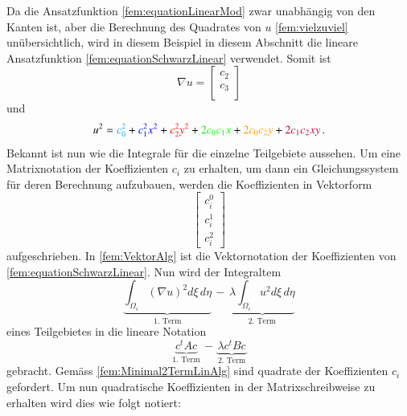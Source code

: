 Da die Ansatzfunktion \eqref{fem:equationLinearMod} zwar unabhängig von den Kanten ist, aber die Berechnung des Quadrates von $u$ \eqref{fem:vielzuviel} unübersichtlich, wird in diesem Beispiel in diesem Abschnitt die lineare Ansatzfunktion \eqref{fem:equationSchwarzLinear} verwendet. Somit ist
\begin{equation}
	\nabla u = 	
	\left[ \begin{array}{r}
	c_2 \\
	c_3 \\
	\end{array}\right] 
	\label{fem:equationSchwarzquadratischPP}
\end{equation}  
und 
\begin{equation}
 	u^2 = \textcolor{cyan}{c_0^2} + \textcolor{blue}{c_1^2 x^2} + \textcolor{red}{c_2^2 y^2} + \textcolor{green}{2 c_0 c_1 x} + \textcolor{orange}{2 c_0 c_2 y} +\textcolor{purple}{ 2 c_1 c_2 xy} \, .
	\label{fem:equationSchwarzquadratischQQQ}
\end{equation}  
Bekannt ist nun wie die Integrale für die einzelne Teilgebiete aussehen. Um eine Matrixnotation der Koeffizienten $c_i$ zu erhalten, um dann ein Gleichungssystem für deren Berechnung aufzubauen, werden die Koeffizienten in Vektorform
\begin{equation}
	\begin{bmatrix}
	c_i^0  \\
	c_i^1 \\
	c_i^2
	\end{bmatrix}
	\label{fem:VektorAlg}
\end{equation}
aufgeschrieben. In \eqref{fem:VektorAlg} ist die Vektornotation der Koeffizienten von \eqref{fem:equationSchwarzLinear}. Nun wird der Integraltem
\begin{equation}
			\underbrace{ \int_{\Omega_i} (\nabla u)^2 d\xi \, d\eta}_{\text{1. Term}} \, -  \, \underbrace{\lambda \int_{\Omega_i} u^2 d\xi \,d\eta}_{\text{2. Term}}
			\label{fem:Minimal2TermLinAlg}
\end{equation}
eines Teilgebietes in die lineare Notation
\begin{equation}
			\underbrace{ c^t Ac}_{\text{1. Term}} \, - \, \underbrace{\lambda c^t Bc}_{\text{2. Term}}
			\label{fem:Minimal2LinAlg}
\end{equation}
gebracht. Gemäss \eqref{fem:Minimal2TermLinAlg} sind quadrate der Koeffizienten $c_i$ gefordert. Um nun quadratische Koeffizienten in der Matrixschreibweise zu erhalten wird dies wie folgt notiert:
